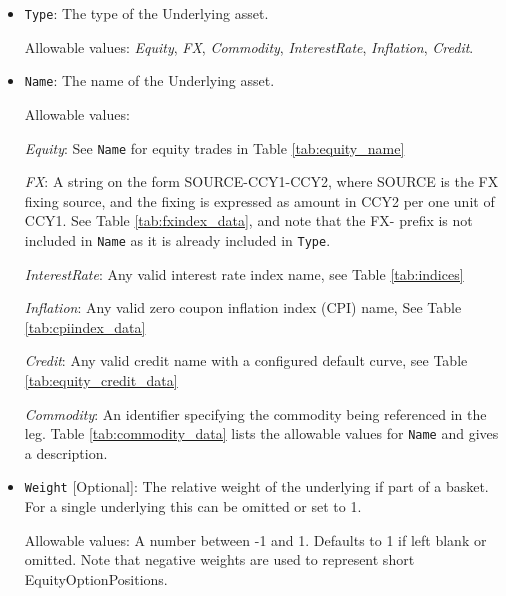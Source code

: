 \begin{itemize}

\item \lstinline!Type!: The type of the Underlying asset.

  Allowable values:  \emph{Equity}, \emph{FX}, \emph{Commodity}, \emph{InterestRate}, \emph{Inflation}, \emph{Credit}.

\item \lstinline!Name!:
  The name of the Underlying asset. 
  
  Allowable values:  

  \emph{Equity}: See \lstinline!Name! for equity trades in Table \ref{tab:equity_name}

  \emph{FX}: A string on the form SOURCE-CCY1-CCY2, where SOURCE is the FX fixing source, and the fixing is expressed as amount in CCY2 per one unit of CCY1.  See Table \ref{tab:fxindex_data}, and note that the FX- prefix is not included in \lstinline!Name! as it is already included in \lstinline!Type!.

 \emph{InterestRate}: Any valid interest rate index name, see Table \ref{tab:indices}

 \emph{Inflation}: Any valid zero coupon inflation index (CPI) name, See Table \ref{tab:cpiindex_data}

 \emph{Credit}: Any valid credit name with a configured default curve, see Table \ref{tab:equity_credit_data}

 \emph{Commodity}: An identifier specifying the commodity being referenced in the leg.
Table \ref{tab:commodity_data} lists the allowable values for \lstinline!Name! and gives a description. \\

\item \lstinline!Weight! [Optional]:
The relative weight of the underlying if part of a basket. For a single underlying this can be omitted or set to 1. 

Allowable values: A number between -1 and 1. Defaults to 1 if left blank or omitted. Note that negative weights are used to represent short EquityOptionPositions.


\end{itemize}
